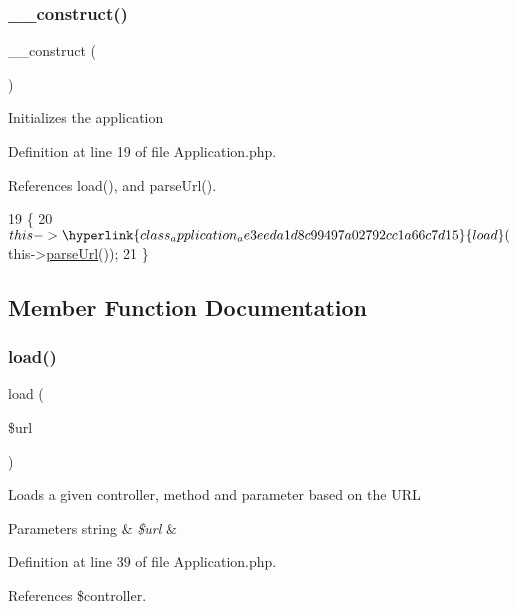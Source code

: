 \subsubsection{\texorpdfstring{\+\_\+\+\_\+construct()}{\_\_construct()}}
{\footnotesize\ttfamily \+\_\+\+\_\+construct (\begin{DoxyParamCaption}{ }\end{DoxyParamCaption})}

Initializes the application 

Definition at line 19 of file Application.\+php.



References load(), and parse\+Url().


\begin{DoxyCode}
19                                   \{
20         $this->\hyperlink{class_application_ae3eeda1d8c99497a02792cc1a66c7d15}{load}($this->\hyperlink{class_application_a354b02f944f9accd1eefa779cfcc1cc8}{parseUrl}());
21     \}
\end{DoxyCode}


\subsection{Member Function Documentation}
\hypertarget{class_application_ae3eeda1d8c99497a02792cc1a66c7d15}{}\label{class_application_ae3eeda1d8c99497a02792cc1a66c7d15} 
\subsubsection{\texorpdfstring{load()}{load()}}
{\footnotesize\ttfamily load (\begin{DoxyParamCaption}\item[{}]{\$url }\end{DoxyParamCaption})\hspace{0.3cm}{\ttfamily [protected]}}

Loads a given controller, method and parameter based on the U\+RL


\begin{DoxyParams}[1]{Parameters}
string & {\em \$url} & \\
\hline
\end{DoxyParams}


Definition at line 39 of file Application.\+php.



References \$controller.



